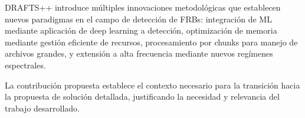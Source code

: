 DRAFTS++ introduce múltiples innovaciones metodológicas que establecen nuevos paradigmas en el campo de detección de FRBs: integración de ML mediante aplicación de deep learning a detección, optimización de memoria mediante gestión eficiente de recursos, procesamiento por chunks para manejo de archivos grandes, y extensión a alta frecuencia mediante nuevos regímenes espectrales.

La contribución propuesta establece el contexto necesario para la transición hacia la propuesta de solución detallada, justificando la necesidad y relevancia del trabajo desarrollado.
